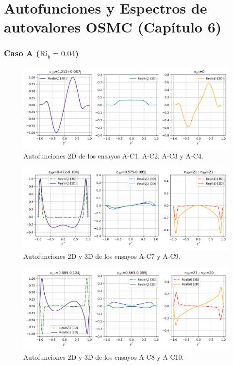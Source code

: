 \chapter{Autofunciones y Espectros de autovalores OSMC (Capítulo 6)} \label{cap:transition_apendice}

\subsection*{Caso A ($\text{Ri}_b=0\text{.}04$)}


\begin{figure}[H]
  \centering
    \includegraphics[width=\textwidth]{figures/apendices/transicion/Re5000-Ri1Em6-Pr071_eigenfun_AC1-AC4.png}
  \caption{Autofunciones 2D de los ensayos A-C1, A-C2, A-C3 y A-C4.}
  \label{fig:eigenfuns1-Re5000-Pr071}
\end{figure}

\begin{figure}[H]
  \centering    
    \includegraphics[width=\textwidth]{figures/apendices/transicion/Re5000-Ri1Em6-Pr071_eigenfun_AC7_AC9.png}
  \caption{Autofunciones 2D y 3D de los ensayos A-C7 y A-C9.}
  \label{fig:eigenfuns2-Re5000-Pr071}
\end{figure}

\begin{figure}[H]
  \centering  
    \includegraphics[width=\textwidth]{figures/apendices/transicion/Re5000-Ri1Em6-Pr071_eigenfun_AC8_AC10.png}
  \caption{Autofunciones 2D y 3D de los ensayos A-C8 y A-C10.}
  \label{fig:eigenfuns3-Re5000-Pr071}
\end{figure}

